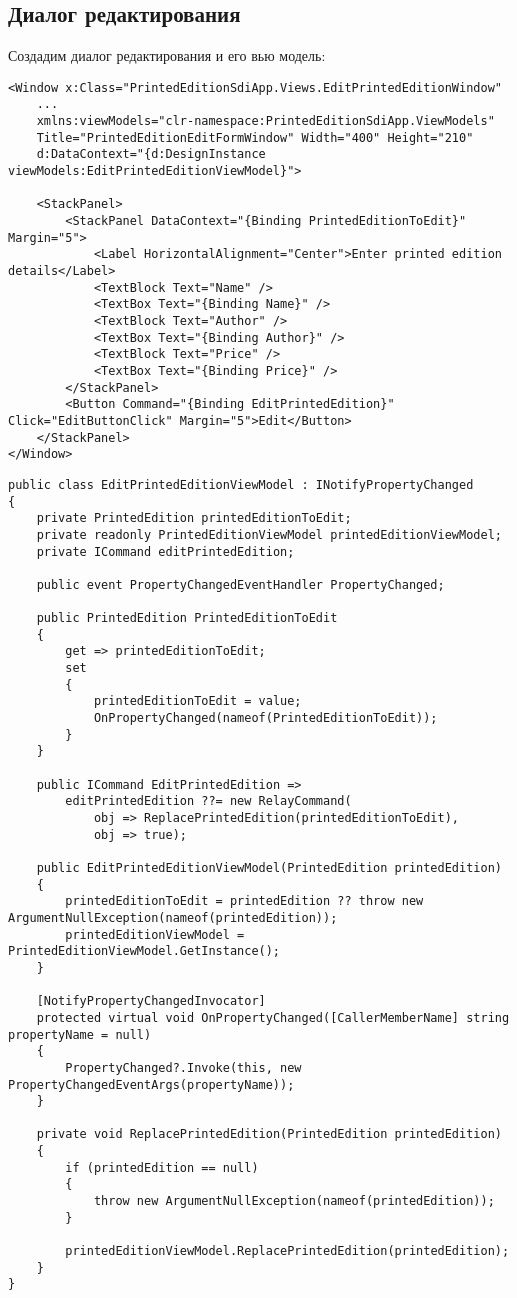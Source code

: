 \documentclass[a4paper,14pt]{extarticle}
\begin{document}
\subsection{Диалог редактирования}
Создадим диалог редактирования и его вью модель:
\begin{lstlisting}
<Window x:Class="PrintedEditionSdiApp.Views.EditPrintedEditionWindow"
    ...
    xmlns:viewModels="clr-namespace:PrintedEditionSdiApp.ViewModels"
    Title="PrintedEditionEditFormWindow" Width="400" Height="210"
    d:DataContext="{d:DesignInstance viewModels:EditPrintedEditionViewModel}">
    
    <StackPanel>
        <StackPanel DataContext="{Binding PrintedEditionToEdit}" Margin="5">
            <Label HorizontalAlignment="Center">Enter printed edition details</Label>
            <TextBlock Text="Name" />
            <TextBox Text="{Binding Name}" />
            <TextBlock Text="Author" />
            <TextBox Text="{Binding Author}" />
            <TextBlock Text="Price" />
            <TextBox Text="{Binding Price}" />
        </StackPanel>
        <Button Command="{Binding EditPrintedEdition}" Click="EditButtonClick" Margin="5">Edit</Button>
    </StackPanel>
</Window>
\end{lstlisting}
    
\begin{lstlisting}
public class EditPrintedEditionViewModel : INotifyPropertyChanged
{
    private PrintedEdition printedEditionToEdit;
    private readonly PrintedEditionViewModel printedEditionViewModel;
    private ICommand editPrintedEdition;

    public event PropertyChangedEventHandler PropertyChanged;

    public PrintedEdition PrintedEditionToEdit
    {
        get => printedEditionToEdit;
        set
        {
            printedEditionToEdit = value;
            OnPropertyChanged(nameof(PrintedEditionToEdit));
        }
    }

    public ICommand EditPrintedEdition =>
        editPrintedEdition ??= new RelayCommand(
            obj => ReplacePrintedEdition(printedEditionToEdit), 
            obj => true);

    public EditPrintedEditionViewModel(PrintedEdition printedEdition)
    {
        printedEditionToEdit = printedEdition ?? throw new ArgumentNullException(nameof(printedEdition));
        printedEditionViewModel = PrintedEditionViewModel.GetInstance();
    }

    [NotifyPropertyChangedInvocator]
    protected virtual void OnPropertyChanged([CallerMemberName] string propertyName = null)
    {
        PropertyChanged?.Invoke(this, new PropertyChangedEventArgs(propertyName));
    }

    private void ReplacePrintedEdition(PrintedEdition printedEdition)
    {
        if (printedEdition == null)
        {
            throw new ArgumentNullException(nameof(printedEdition));
        }
        
        printedEditionViewModel.ReplacePrintedEdition(printedEdition);
    }
}
\end{lstlisting}
\end{document}

